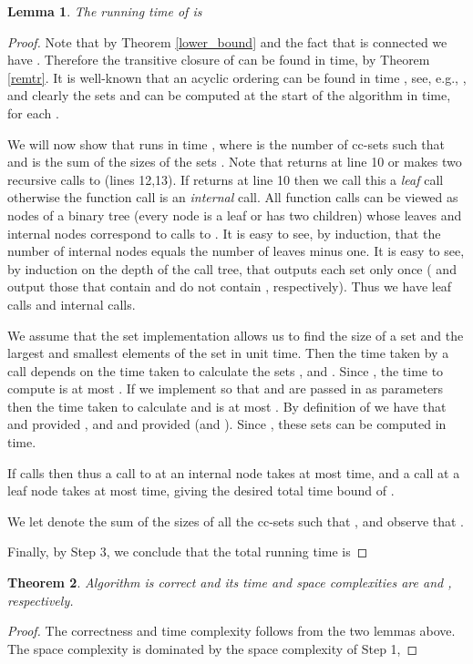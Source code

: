 \documentclass[11pt]{article}
\newcommand{\2}{\vspace{0.2 cm}}
\newtheorem{theorem}{Theorem}[section]
\newtheorem{lemma}[theorem]{Lemma}
\begin{document}
\begin{lemma}\label{runtlem}
The running time of  is 
\end{lemma}
\begin{proof} Note that by Theorem \ref{lower_bound} and the fact that  is
connected we have . Therefore the
transitive closure of  can be found in  time,
by Theorem \ref{remtr}. It is well-known that an acyclic ordering can
be found in time , see, e.g., \cite{bang2000}, and clearly
the sets  and  can be computed at
the start of the algorithm in  time, for each .


We will now show that  runs in time , where  is the number of cc-sets 
such that  and  is the
sum of the sizes of the sets . Note that  returns at
line 10 or makes two recursive calls to  (lines 12,13). If
 returns at line 10 then we call this a {\em leaf} call
otherwise the function call is an {\em internal} call. All function
calls can be viewed as nodes of a binary tree (every node is a leaf
or has two children) whose leaves and internal nodes correspond to
calls to . It is easy to see, by induction, that the number
of internal nodes equals the number of leaves minus one. It is easy
to see, by induction on the depth of the call tree, that 
outputs each set  only once (
and  output those that contain 
and do not contain , respectively). Thus we have  leaf
calls and  internal calls.

We assume that the set implementation allows us to find the size of
a set and the largest and smallest elements of the set in unit time.
Then the time taken by a call   depends on the time
taken to calculate the sets ,  and . Since , the time to compute  is at most . If we implement
 so that  and 
are passed in as parameters then the time taken to calculate  and
 is at most . By definition of  we have that   and  provided , and 
and  provided
 (and ). Since , these
sets can be computed in  time.

If  calls  then  thus
a call to  at an internal node takes at most   time,
and a call at a leaf node takes at most  time, giving
the desired total time bound of .

We let  denote the sum of the sizes of all the cc-sets  such
that , and observe that
.

Finally, by Step 3, we conclude that the total running time is
\end{proof}

\begin{theorem}\label{maint}
Algorithm  is correct and its time and space complexities
are  and , respectively.
\end{theorem}
\begin{proof} The correctness and time complexity follows from the two lemmas
above. The space complexity is dominated by the space complexity of
Step 1, \end{proof}
\end{document}
